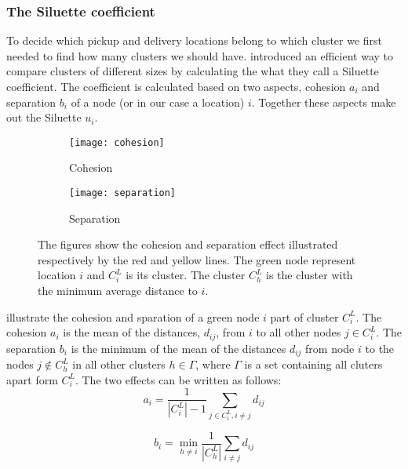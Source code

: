 \documentclass[../main.tex]{subfiles}
\begin{document}
\subsubsection{The Siluette coefficient}
To decide which pickup and delivery locations belong to which cluster we first needed to find how many clusters we should have.  
\cite{kaufman90} introduced an efficient way to compare clusters of different sizes by calculating the what they call a Siluette coefficient.
The coefficient is calculated based on two aspects, cohesion $a_i$ and separation $b_i$ of a node (or in our case a location) $i$. 
Together these aspects make out the Siluette $u_i$.
\begin{figure}
\centering
    \begin{subfigure}[b]{0.35\textwidth}
        \centering
        \texttt{[image: cohesion]}
        \caption{Cohesion}
        \label{fig:cohesion}
    \end{subfigure}
    \hfill
    \begin{subfigure}[b]{0.60\textwidth}
        \centering
        \texttt{[image: separation]}
        \caption{Separation}
        \label{fig:separation}
    \end{subfigure}
    \caption{The figures show the cohesion and separation effect illustrated respectively by the red and yellow lines. The green node represent location $i$ and $C^L_i$ is its cluster. The cluster $C^L_h$ is the cluster with the minimum average distance to $i$. }
    \label{fig:siluette}
\end{figure}


 illustrate the cohesion and sparation of a green node $i$ part of cluster $C^L_i$. 
The cohesion $a_i$ is the mean of the distances, $d_{ij}$, from $i$ to all other nodes $j\in C^L_i$. 
The separation $b_i$ is the minimum of the mean of the distances $d_{ij}$ from node $i$ to the nodes $j\not\in C^L_h$ in all other clusters $h\in \Gamma$, where $\Gamma$ is a set containing all cluters apart form $C^L_i$.
The two effects can be written as follows:
\begin{equation}
    \label{eq:cohesion}
    a_i = \dfrac{1}{|C^L_i|-1}\sum_{j\in C^L_i, i\neq j}{d_{ij}}
\end{equation}

\begin{equation}
    \label{eq:cohesion}
    b_i = \min_{h\neq i} \dfrac{1}{|C^L_h|}\sum_{i\neq j}{d_{ij}}
\end{equation}
\end{document}

